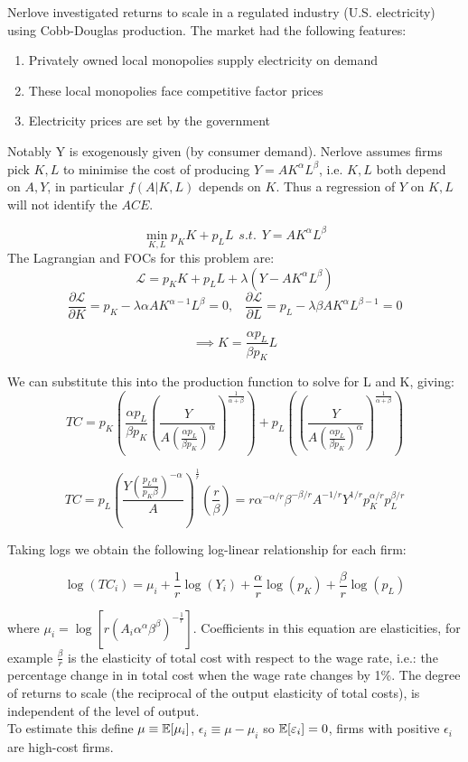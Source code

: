 \documentclass[DIV=14,titlepage=false]{scrreprt}
\begin{document}
\begin{example}
Nerlove investigated returns to scale in a regulated industry (U.S. electricity) using Cobb-Douglas production. The market had the following features:
\begin{enumerate}
    \item Privately owned local monopolies supply electricity on demand 
    \item These local monopolies face competitive factor prices
    \item Electricity prices are set by the government
\end{enumerate}
Notably Y is exogenously given (by consumer demand). Nerlove assumes firms pick $K,L$ to minimise the cost of producing $Y=AK^{\alpha}L^{\beta}$, i.e. $K,L$ both depend on $A,Y$, in particular $f(A|K,L)$ depends on $K$. Thus a regression of $Y$ on $K,L$ will not identify the $ACE$.

\[ \min_{K, L} p_K K + p_L L \hspace{5pt} s.t. \hspace{5pt} Y=AK^{\alpha}L^{\beta}\]
The Lagrangian and FOCs for this problem are:
\[ \mathcal{L} = p_K K + p_L L + \lambda(Y - AK^\alpha L^\beta) \]
\[ \frac{\partial \mathcal{L}}{\partial K} = p_K - \lambda \alpha AK^{\alpha-1}L^\beta = 0 , \hspace{10pt} \frac{\partial \mathcal{L}}{\partial L} = p_L - \lambda \beta AK^\alpha L^{\beta-1} = 0 \]

\[ \implies K = \frac{\alpha p_L}{\beta p_K} L \]

We can substitute this into the production function to solve for L and K, giving:
\[ TC = p_K \left(\frac{\alpha p_L}{\beta p_K} \left(\frac{Y}{A\left(\frac{\alpha p_L}{\beta p_K}\right)^\alpha}\right)^{\frac{1}{\alpha + \beta}}\right) + p_L \left(\left(\frac{Y}{A\left(\frac{\alpha p_L}{\beta p_K}\right)^\alpha}\right)^{\frac{1}{\alpha + \beta}}\right) \]

\[ TC = p_L \left( \frac{Y \left(\frac{p_L \alpha}{p_K \beta}\right)^{-\alpha}}{A} \right)^{\frac{1}{r}} \left( \frac{r}{\beta} \right)  = r \alpha^{-\alpha/r} \beta^{-\beta/r} A^{-1/r} Y^{1/r} p_K^{\alpha/r} p_L^{\beta/r} \]

Taking logs we obtain the following log-linear relationship for each firm:

\[ \log(TC_i)=\mu_i + \frac{1}{r}\log(Y_i)+\frac{\alpha}{r}\log(p_K)+\frac{\beta}{r}\log(p_L)\]

where $\mu_i = \log[r(A_i {\alpha}^{\alpha} {\beta}^{\beta})^{-\frac{1}{r}}]$. Coefficients in this equation are elasticities, for example $\frac{\beta}{r}$ is the elasticity of total cost with respect to the wage rate, i.e.: the percentage change in in total cost when the wage rate changes by 1\%. The degree of returns to scale (the reciprocal of the output elasticity of total costs), is independent of the level of output.\\
To estimate this define $\mu \equiv \mathbb{E}[\mu_i]$, $\epsilon_i \equiv \mu - \mu_i$ so $\mathbb{E}[\varepsilon_i]=0$, firms with positive $\epsilon_i$ are high-cost firms.


\end{example}
\end{document}
